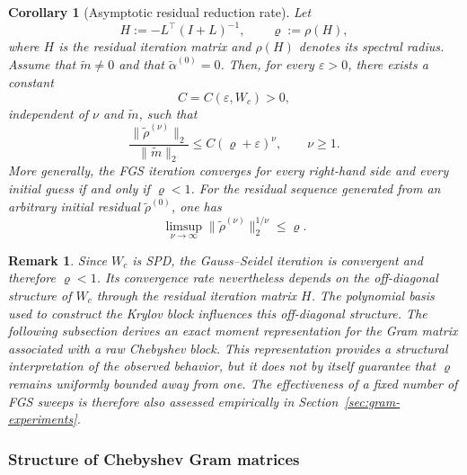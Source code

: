 \documentclass[pdflatex,sn-mathphys-num]{sn-jnl}%
\newtheorem{corollary}{Corollary}
\newtheorem{remark}{Remark}
\begin{document}
\begin{corollary}[Asymptotic residual reduction rate]
\label{cor:spectral_radius}
Let
\[
H:=-L^\top(I+L)^{-1},
\qquad
\varrho:=\rho(H),
\]
where $H$ is the residual iteration matrix and $\rho(H)$ denotes its
spectral radius. Assume that $\widetilde m\neq0$ and that
$\widetilde{\alpha}^{(0)}=0$. Then, for every $\varepsilon>0$, there
exists a constant
\[
C=C(\varepsilon,W_c)>0,
\]
independent of $\nu$ and $\widetilde m$, such that
\begin{equation}
\label{eq:spectral_bound}
\frac{\|\widetilde{\rho}^{(\nu)}\|_2}
     {\|\widetilde m\|_2}
\leq
C(\varrho+\varepsilon)^\nu,
\qquad
\nu\geq1.
\end{equation}
More generally, the FGS iteration converges for every right-hand side
and every initial guess if and only if $\varrho<1$. For the residual
sequence generated from an arbitrary initial residual
$\widetilde{\rho}^{(0)}$, one has
\begin{equation}
\label{eq:asymptotic-residual-rate}
\limsup_{\nu\to\infty}
\|\widetilde{\rho}^{(\nu)}\|_2^{1/\nu}
\leq
\varrho.
\end{equation}
\end{corollary}
\begin{remark}
Since $W_c$ is SPD, the Gauss--Seidel iteration is convergent and
therefore $\varrho<1$. Its convergence rate nevertheless depends on
the off-diagonal structure of $W_c$ through the residual iteration
matrix $H$. The
polynomial basis used to construct the Krylov block influences this
off-diagonal structure. The following subsection derives an exact
moment representation for the Gram matrix associated with a raw
Chebyshev block. This representation provides a structural
interpretation of the observed behavior, but it does not by itself
guarantee that $\varrho$ remains uniformly bounded away from one.
The effectiveness of a fixed number of FGS sweeps is therefore also
assessed empirically in Section~\ref{sec:gram-experiments}.
\end{remark}

\subsubsection{Structure of Chebyshev Gram matrices}
\label{sec:cheb-gram-structure}
\end{document}
